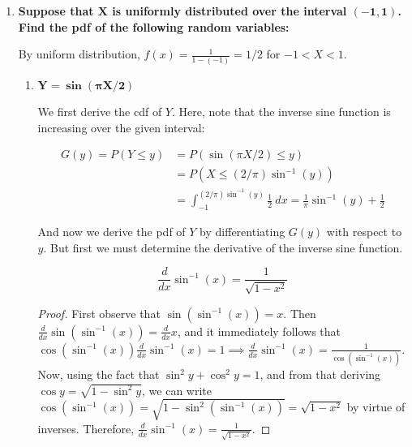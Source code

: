 \documentclass[10pt, oneside]{article}
\begin{document}
\begin{enumerate}[label=5.\arabic*]
\begin{enumerate}
	Note that $Z = 1 / (X + 1)$ over $0 < X < 1$ implies $1/2 < Z < 1$. Then $g(z) \geq 0$ over $1/2 < Z < 1$. Moreover, $G(1) - G(1/2) = \boxed{1}$.
	
	Alternatively, we can apply Theorem 5.1 because $Z = 1 / (X + 1)$ is monotonic over $1/2 < Z < 1$. Then $X(z) = 1/z - 1$ and $\frac{dx}{dz} = -1/z^2$, then $\big| \frac{dx}{dz} \big| = 1/z^2$. Therefore $g(z) = 1/z^2$, as expected.
	
	\end{enumerate}

\item  \begin{tcolorbox}[
  colback=Cerulean!5!white,
  colframe=Cerulean!75!black]
\textbf{Suppose that $\bm{X}$ is uniformly distributed over the interval $\bm{(-1,1)}$. Find the pdf of the following random variables:}
\end{tcolorbox}

By uniform distribution, $f(x) = \frac{1}{1 - (-1)} = 1/2$ for $-1 < X < 1$.

	\begin{enumerate}
	\item  \begin{tcolorbox}[
	  colback=Cerulean!5!white,
	  colframe=Cerulean!75!black]
	\textbf{$\bm{Y = \sin (\pi X / 2)}$}
	\end{tcolorbox}
	
	We first derive the cdf of $Y$. Here, note that the inverse sine function is increasing over the given interval:
	
	\begin{align*}
	G(y) = P(Y \leq y) &= P(\sin (\pi X / 2) \leq y) \\
	&= P(X \leq (2 / \pi) \sin^{-1} (y)) \\
	&= \int^{(2 / \pi) \sin^{-1} (y)}_{-1} \frac{1}{2} \ dx = \frac{1}{\pi} \sin^{-1} (y) + \frac{1}{2}
	\end{align*}
	
	And now we derive the pdf of $Y$ by differentiating $G(y)$ with respect to $y$. But first we must determine the derivative of the inverse sine function.
	
	\begin{thm}
	\[ \frac{d}{dx} \sin^{-1} (x) = \frac{1}{\sqrt{1 - x^2}} \]
	\end{thm}
	
	\begin{proof}
	First observe that $\sin( \sin^{-1} (x)) = x$. Then $\frac{d}{dx} \sin( \sin^{-1} (x)) = \frac{d}{dx} x$, and it immediately follows that $\cos (\sin^{-1} (x)) \frac{d}{dx} \sin^{-1} (x) = 1 \implies \frac{d}{dx} \sin^{-1} (x) = \frac{1}{\cos( \sin^{-1} (x))}$. Now, using the fact that $\sin^2 y + \cos^2 y = 1$, and from that deriving $\cos y = \sqrt{1 - \sin^2 y}$, we can write $\cos (\sin^{-1} (x)) = \sqrt{1 - \sin^2 (\sin^{-1} (x))} = \sqrt{1 - x^2}$ by virtue of inverses. Therefore, $\frac{d}{dx} \sin^{-1} (x) = \frac{1}{\sqrt{1 - x^2}}$.  
	\end{proof}
	

\end{enumerate}
\end{enumerate}
\end{document}

